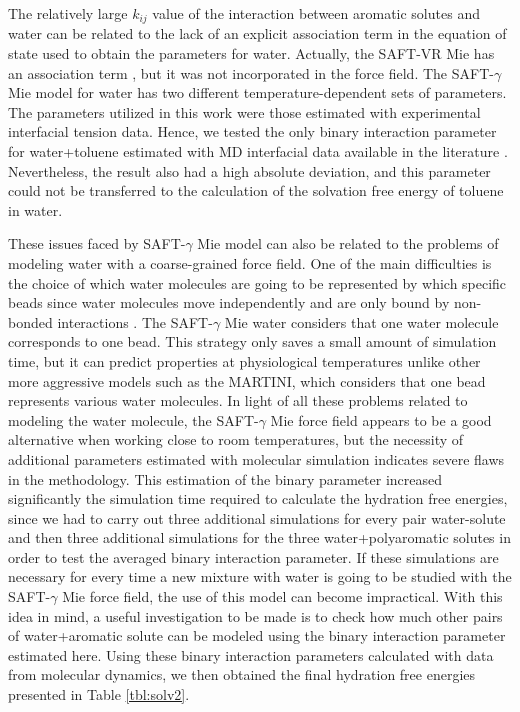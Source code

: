 The relatively large $k_{ij}$ value of the interaction between aromatic solutes and water can be related to the lack of an explicit association term in the equation of state used to obtain the parameters for water. Actually, the SAFT-VR Mie has an association term \cite{lafitte2013}, but it was not incorporated in the force field. The SAFT-$\gamma$ Mie model for water \cite{lobanova2016} has two different temperature-dependent sets of parameters. The parameters utilized in this work were those estimated with experimental interfacial tension data. Hence, we tested the only binary interaction parameter for water+toluene estimated with MD interfacial data available in the literature \cite{herdes2017}. Nevertheless, the result also had a high absolute deviation, and this parameter could not be transferred to the calculation of the solvation free energy of toluene in water. 

These issues faced by SAFT-$\gamma$ Mie model can also be related to the problems of modeling water with a coarse-grained force field. One of the main difficulties is the choice of which water molecules are going to be represented by which specific beads since water molecules move independently and are only bound by non-bonded interactions \cite{hadley2010,hadley2012}. The  SAFT-$\gamma$ Mie water considers that one water molecule corresponds to one bead. This strategy only saves a small amount of simulation time, but it can predict properties at physiological temperatures unlike other more aggressive models such as the MARTINI, which considers that one bead represents various water molecules. In light of all these problems related to modeling the water molecule, the SAFT-$\gamma$ Mie force field appears to be a good alternative when working close to room temperatures, but the necessity of additional parameters estimated with molecular simulation indicates severe flaws in the methodology. This estimation of the binary parameter increased significantly the simulation time required to calculate the hydration free energies, since we had to carry out three additional simulations for every pair water-solute and then three additional simulations for the three water+polyaromatic solutes in order to test the averaged binary interaction parameter. If these simulations are necessary for every time a new mixture with water is going to be studied with the SAFT-$\gamma$ Mie force field, the use of this model can become impractical.  With this idea in mind, a useful investigation to be made is to check how much other pairs of water+aromatic solute can be modeled using the binary interaction parameter estimated here. Using these binary interaction parameters calculated with data from molecular dynamics, we then obtained the final hydration free energies presented in Table \ref{tbl:solv2}. 

